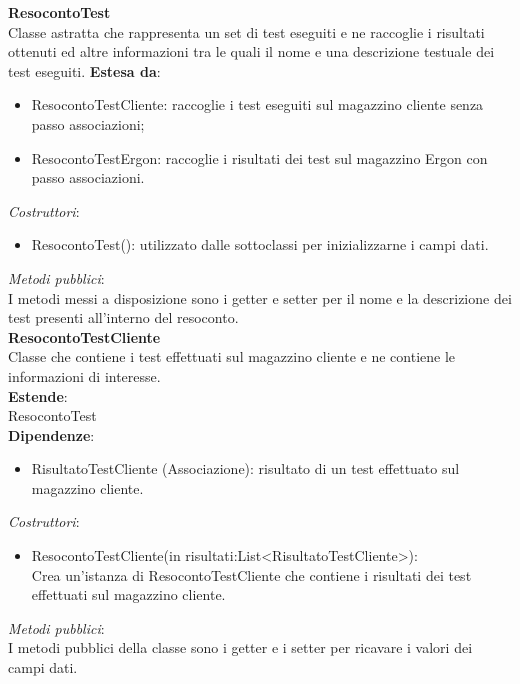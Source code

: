 \textbf{ResocontoTest}\\
Classe astratta che rappresenta un set di test eseguiti e ne raccoglie i risultati ottenuti ed altre informazioni tra le quali il nome e una descrizione testuale dei test eseguiti.
\textbf{Estesa da}:
\begin{itemize}
    \item ResocontoTestCliente: raccoglie i test eseguiti sul magazzino cliente senza passo associazioni;
    \item ResocontoTestErgon: raccoglie i risultati dei test sul magazzino Ergon con passo associazioni.\\
\end{itemize}
\textit{Costruttori}:\\
\begin{itemize}
    \item ResocontoTest(): utilizzato dalle sottoclassi per inizializzarne i campi dati.\\
\end{itemize}
\textit{Metodi pubblici}:\\
I metodi messi a disposizione sono i getter e setter per il nome e la descrizione dei test presenti all'interno del resoconto.\\
\textbf{ResocontoTestCliente}\\
Classe che contiene i test effettuati sul magazzino cliente e ne contiene le informazioni di interesse.\\
\textbf{Estende}:\\
ResocontoTest\\
\textbf{Dipendenze}:
\begin{itemize}
    \item RisultatoTestCliente (Associazione): risultato di un test effettuato sul magazzino cliente.\\
\end{itemize}
\textit{Costruttori}:\\
\begin{itemize}
    \item ResocontoTestCliente(in risultati:List<RisultatoTestCliente>):\\
    Crea un'istanza di ResocontoTestCliente che contiene i risultati dei test effettuati sul magazzino cliente.\\
\end{itemize}
\textit{Metodi pubblici}:\\
I metodi pubblici della classe sono i getter e i setter per ricavare i valori dei campi dati.\\
